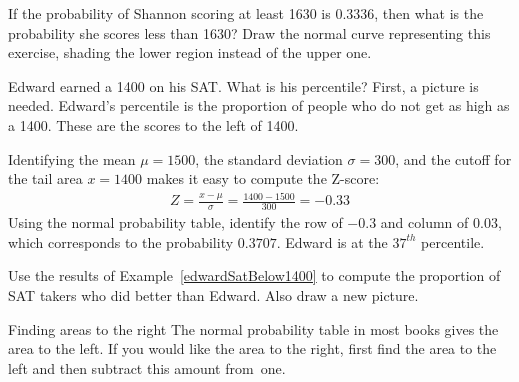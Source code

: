 \begin{exercisewrap}
\begin{nexercise}
If the probability of Shannon scoring at least 1630 is 0.3336, then what is the probability she scores less than 1630? Draw the normal curve representing this exercise, shading the lower region instead of the upper one.\footnotemark
\end{nexercise}
\end{exercisewrap}

\begin{examplewrap}
\begin{nexample}{Edward earned a 1400 on his SAT. What is his percentile?} \label{edwardSatBelow1400}
First, a picture is needed. Edward's percentile is the proportion of people who do not get as high as a 1400. These are the scores to the left of 1400.
\begin{center}
\end{center}
Identifying the mean $\mu=1500$, the standard deviation $\sigma=300$, and the cutoff for the tail area $x=1400$ makes it easy to compute the Z-score:
\begin{eqnarray*}
Z = \frac{x - \mu}{\sigma} = \frac{1400 - 1500}{300} = -0.33
\end{eqnarray*}
Using the normal probability table, identify the row of $-0.3$ and column of $0.03$, which corresponds to the probability $0.3707$. Edward is at the $37^{th}$ percentile.
\end{nexample}
\end{examplewrap}

\begin{exercisewrap}
\begin{nexercise}
Use the results of Example~\ref{edwardSatBelow1400} to compute the proportion of SAT takers who did better than Edward. Also draw a new picture.\footnotemark
\end{nexercise}
\end{exercisewrap}

\begin{onebox}{Finding areas to the right}
The normal probability table in most books gives the area to the left. If you would like the area to the right, first find the area to the left and then subtract this amount from~one.
\end{onebox}

